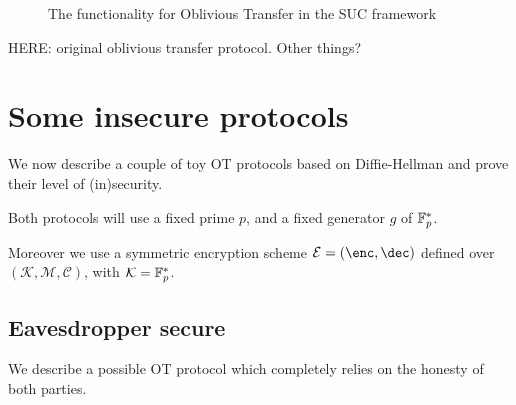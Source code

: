 \begin{figure}
    \begin{center}
    \end{center}
    \caption{The functionality for Oblivious Transfer in the SUC framework}
    \label{func_ot_base}
\end{figure}

HERE: original oblivious transfer protocol. Other things?


\section{Some insecure protocols}

We now describe a couple of toy OT protocols based on Diffie-Hellman and prove their level of (in)security.

Both protocols will use a fixed prime $p$, and a fixed generator $g$ of $\mathbb{F}_p^\ast$.

Moreover we use a symmetric encryption scheme $\mathcal{E}=(\enc, \dec)$ defined over $(\mathcal{K, M, C})$, with $\mathcal{K}=\mathbb{F}_p^\ast$.

\subsection{Eavesdropper secure}
We describe a possible OT protocol which completely relies on the honesty of both parties.

